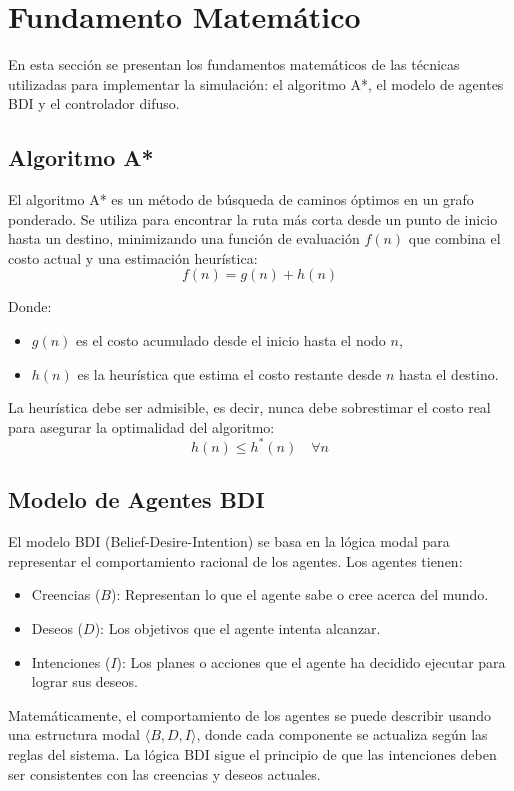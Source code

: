 \documentclass[10pt,twocolumn]{article}
\begin{document}
	\section{Fundamento Matemático}
	En esta sección se presentan los fundamentos matemáticos de las técnicas utilizadas para implementar la simulación: el algoritmo A*, el modelo de agentes BDI y el controlador difuso.
	
	\subsection{Algoritmo A*}
	El algoritmo A* es un método de búsqueda de caminos óptimos en un grafo ponderado. Se utiliza para encontrar la ruta más corta desde un punto de inicio hasta un destino, minimizando una función de evaluación \(f(n)\) que combina el costo actual y una estimación heurística:
	\[
	f(n) = g(n) + h(n)
	\]
	
	Donde:
	\begin{itemize}
		\item \(g(n)\) es el costo acumulado desde el inicio hasta el nodo \(n\),
		\item \(h(n)\) es la heurística que estima el costo restante desde \(n\) hasta el destino.
	\end{itemize}
	
	La heurística debe ser admisible, es decir, nunca debe sobrestimar el costo real para asegurar la optimalidad del algoritmo:
	\[
	h(n) \leq h^*(n) \quad \forall n
	\]
	
	
	\subsection{Modelo de Agentes BDI}
	El modelo BDI (Belief-Desire-Intention) se basa en la lógica modal para representar el comportamiento racional de los agentes. Los agentes tienen:
	\begin{itemize}
		\item Creencias (\(B\)): Representan lo que el agente sabe o cree acerca del mundo.
		\item Deseos (\(D\)): Los objetivos que el agente intenta alcanzar.
		\item Intenciones (\(I\)): Los planes o acciones que el agente ha decidido ejecutar para lograr sus deseos.
	\end{itemize}
	
	Matemáticamente, el comportamiento de los agentes se puede describir usando una estructura modal \( \langle B, D, I \rangle \), donde cada componente se actualiza según las reglas del sistema. La lógica BDI sigue el principio de que las intenciones deben ser consistentes con las creencias y deseos actuales.
	
\end{document}
